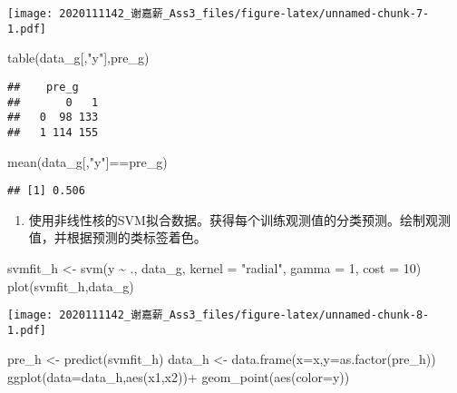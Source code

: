 \documentclass[
]{article}
\newenvironment{Shaded}{\begin{snugshade}}{\end{snugshade}}
\newcommand{\AttributeTok}[1]{\textcolor[rgb]{0.77,0.63,0.00}{#1}}
\newcommand{\DecValTok}[1]{\textcolor[rgb]{0.00,0.00,0.81}{#1}}
\newcommand{\FunctionTok}[1]{\textcolor[rgb]{0.00,0.00,0.00}{#1}}
\newcommand{\NormalTok}[1]{#1}
\newcommand{\OtherTok}[1]{\textcolor[rgb]{0.56,0.35,0.01}{#1}}
\newcommand{\SpecialCharTok}[1]{\textcolor[rgb]{0.00,0.00,0.00}{#1}}
\newcommand{\StringTok}[1]{\textcolor[rgb]{0.31,0.60,0.02}{#1}}
\providecommand{\tightlist}{%
  \setlength{\itemsep}{0pt}\setlength{\parskip}{0pt}}
\begin{document}
\texttt{[image: 2020111142\_谢嘉薪\_Ass3\_files/figure-latex/unnamed-chunk-7-1.pdf]}

\begin{Shaded}
\begin{Highlighting}[]
\FunctionTok{table}\NormalTok{(data\_g[,}\StringTok{"y"}\NormalTok{],pre\_g)}
\end{Highlighting}
\end{Shaded}

\begin{verbatim}
##    pre_g
##       0   1
##   0  98 133
##   1 114 155
\end{verbatim}

\begin{Shaded}
\begin{Highlighting}[]
\FunctionTok{mean}\NormalTok{(data\_g[,}\StringTok{"y"}\NormalTok{]}\SpecialCharTok{==}\NormalTok{pre\_g)}
\end{Highlighting}
\end{Shaded}

\begin{verbatim}
## [1] 0.506
\end{verbatim}

\begin{enumerate}
\def\labelenumi{(\alph{enumi})}
\setcounter{enumi}{7}
\tightlist
\item
  使用非线性核的SVM拟合数据。获得每个训练观测值的分类预测。绘制观测值，并根据预测的类标签着色。
\end{enumerate}

\begin{Shaded}
\begin{Highlighting}[]
\NormalTok{svmfit\_h }\OtherTok{\textless{}{-}} \FunctionTok{svm}\NormalTok{(y }\SpecialCharTok{\textasciitilde{}}\NormalTok{ ., data\_g, }\AttributeTok{kernel =} \StringTok{"radial"}\NormalTok{, }\AttributeTok{gamma =} \DecValTok{1}\NormalTok{, }\AttributeTok{cost =} \DecValTok{10}\NormalTok{)}
\FunctionTok{plot}\NormalTok{(svmfit\_h,data\_g)}
\end{Highlighting}
\end{Shaded}

\texttt{[image: 2020111142\_谢嘉薪\_Ass3\_files/figure-latex/unnamed-chunk-8-1.pdf]}

\begin{Shaded}
\begin{Highlighting}[]
\NormalTok{pre\_h }\OtherTok{\textless{}{-}} \FunctionTok{predict}\NormalTok{(svmfit\_h)}
\NormalTok{data\_h }\OtherTok{\textless{}{-}} \FunctionTok{data.frame}\NormalTok{(}\AttributeTok{x=}\NormalTok{x,}\AttributeTok{y=}\FunctionTok{as.factor}\NormalTok{(pre\_h))}
\FunctionTok{ggplot}\NormalTok{(}\AttributeTok{data=}\NormalTok{data\_h,}\FunctionTok{aes}\NormalTok{(x1,x2))}\SpecialCharTok{+}
  \FunctionTok{geom\_point}\NormalTok{(}\FunctionTok{aes}\NormalTok{(}\AttributeTok{color=}\NormalTok{y))}
\end{Highlighting}
\end{Shaded}
\end{document}
